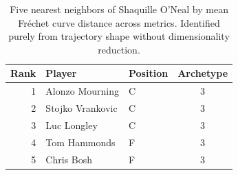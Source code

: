 \begin{table}[htbp]
  \centering\small
  \begin{tabular}{rllc}
    \toprule
    Rank & Player & Position & Archetype \\
    \midrule
    1 & Alonzo Mourning & C & 3 \\
    2 & Stojko Vrankovic & C & 3 \\
    3 & Luc Longley & C & 3 \\
    4 & Tom Hammonds & F & 3 \\
    5 & Chris Bosh & F & 3 \\
    \bottomrule
  \end{tabular}
  \caption{Five nearest neighbors of Shaquille O'Neal by mean Fr\'{e}chet curve distance across metrics. Identified purely from trajectory shape without dimensionality reduction.}
  \label{tab:Shaquille_O_Neal_frechet_curve_neighbors}
\end{table}

